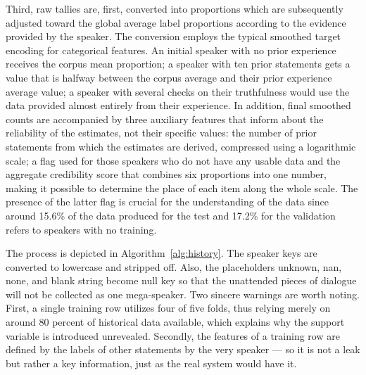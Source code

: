 \documentclass[10pt,twocolumn,twoside,a4paper]{article}
\begin{document}
Third, raw tallies are, first, converted into proportions which are subsequently adjusted toward the global average label proportions according to the evidence provided by the speaker. The conversion employs the typical smoothed target encoding for categorical features. An initial speaker with no prior experience receives the corpus mean proportion; a speaker with ten prior statements gets a value that is halfway between the corpus average and their prior experience average value; a speaker with several checks on their truthfulness would use the data provided almost entirely from their experience. In addition, final smoothed counts are accompanied by three auxiliary features that inform about the reliability of the estimates, not their specific values: the number of prior statements from which the estimates are derived, compressed using a logarithmic scale; a flag used for those speakers who do not have any usable data and the aggregate credibility score that combines six proportions into one number, making it possible to determine the place of each item along the whole scale. The presence of the latter flag is crucial for the understanding of the data since around 15.6\% of the data produced for the test and 17.2\% for the validation refers to speakers with no training.

The process is depicted in Algorithm~\ref{alg:history}. The speaker keys are converted to lowercase and stripped off. Also, the placeholders unknown, nan, none, and blank string become null key so that the unattended pieces of dialogue will not be collected as one mega-speaker. Two sincere warnings are worth noting. First, a single training row utilizes four of five folds, thus relying merely on around 80 percent of historical data available, which explains why the support variable is introduced unrevealed. Secondly, the features of a training row are defined by the labels of other statements by the very speaker --- so it is not a leak but rather a key information, just as the real system would have it.
\end{document}
